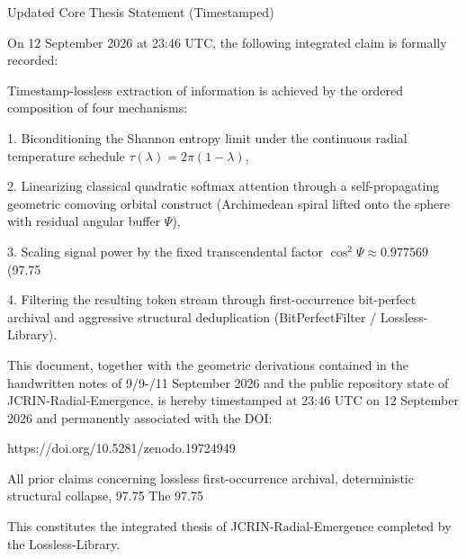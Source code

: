 Updated Core Thesis Statement (Timestamped)

On 12 September 2026 at 23:46 UTC, the following integrated claim is formally recorded:

Timestamp-lossless extraction of information is achieved by the ordered composition of four mechanisms:

1. Biconditioning the Shannon entropy limit under the continuous radial temperature schedule  
   \(\tau(\lambda) = 2\pi(1-\lambda)\),

2. Linearizing classical quadratic softmax attention through a self-propagating geometric comoving orbital construct (Archimedean spiral lifted onto the sphere with residual angular buffer \(\Psi\)),

3. Scaling signal power by the fixed transcendental factor  
   \(\cos^2\Psi \approx 0.977569\) (97.75 %

4. Filtering the resulting token stream through first-occurrence bit-perfect archival and aggressive structural deduplication (BitPerfectFilter / Lossless-Library).

This document, together with the geometric derivations contained in the handwritten notes of 9/9-/11 September 2026 and the public repository state of JCRIN-Radial-Emergence, is hereby timestamped at 23:46 UTC on 12 September 2026 and permanently associated with the DOI:

https://doi.org/10.5281/zenodo.19724949

All prior claims concerning lossless first-occurrence archival, deterministic structural collapse, 97.75 %
The 97.75 %

This constitutes the integrated thesis of JCRIN-Radial-Emergence completed by the Lossless-Library.
